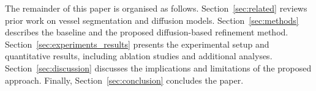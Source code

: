 \documentclass[journal,article,submit,pdftex,moreauthors]{Definitions/mdpi}
\begin{document}





The remainder of this paper is organised as follows. Section~\ref{sec:related} reviews prior work on vessel segmentation and diffusion models. Section~\ref{sec:methods} describes the baseline and the proposed diffusion-based refinement method. Section~\ref{sec:experiments_results} presents the experimental setup and quantitative results, including ablation studies and additional analyses. Section~\ref{sec:discussion} discusses the implications and limitations of the proposed approach. Finally, Section~\ref{sec:conclusion} concludes the paper.
\end{document}
